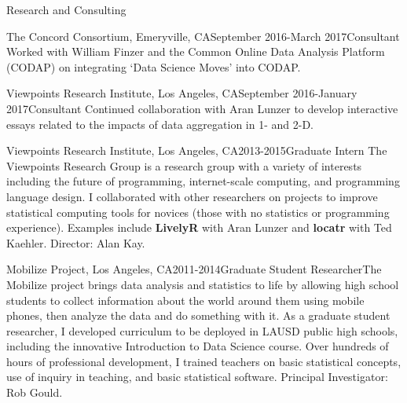 \documentclass{resume} %
\begin{document}
\begin{rSection}{Research and Consulting}


\begin{pSubsection}{The Concord Consortium, }{Emeryville, CA}{September 2016-March 2017}{Consultant}
{Worked with William Finzer and the Common Online Data Analysis Platform (CODAP) on integrating `Data Science Moves' into CODAP.}
\end{pSubsection}


\begin{pSubsection}{Viewpoints Research Institute, }{Los Angeles, CA}{September 2016-January 2017}{Consultant}
{Continued collaboration with Aran Lunzer to develop interactive essays related to the impacts of data aggregation in 1- and 2-D.}
\end{pSubsection}

\begin{pSubsection}{Viewpoints Research Institute, }{Los Angeles, CA}{2013-2015}{Graduate Intern}
{The Viewpoints Research Group is a research group with a variety of interests including the future of programming, internet-scale computing, and programming language design. I collaborated with other researchers on projects to improve statistical computing tools for novices (those with no statistics or programming experience). Examples include \textbf{LivelyR} with Aran Lunzer and \textbf{locatr} with Ted Kaehler. Director: Alan Kay.}
\end{pSubsection}

\begin{pSubsection}{Mobilize Project, }{Los Angeles, CA}{2011-2014}{Graduate Student Researcher}{The Mobilize project brings data analysis and statistics to life by allowing high school students to collect information about the world around them using mobile phones, then analyze the data and do something with it. As a graduate student researcher, I developed curriculum to be deployed in LAUSD public high schools, including the innovative Introduction to Data Science course. Over hundreds of hours of professional development, I trained teachers on basic statistical concepts, use of inquiry in teaching, and basic statistical software. Principal Investigator: Rob Gould.}
\end{pSubsection}
\end{rSection}
\end{document}
